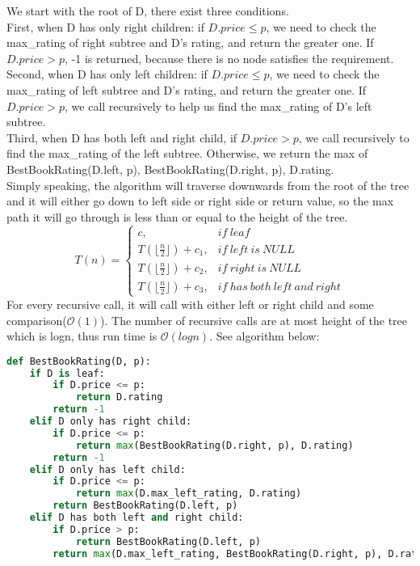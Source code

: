 \documentclass[10pt]{article}
\begin{document}
\begin{enumerate}
We start with the root of D, there exist three conditions.\\
First, when D has only right children: if $D.price \leq p$, we need to check the max\_rating of right subtree and D's rating, and return the greater one. If $D.price > p$, -1 is returned, because there is no node satisfies the requirement.\\Second, when D has only left children: if $D.price \leq p$, we need to check the max\_rating of left subtree and D's rating, and return the greater one. If $D.price > p$, we call recursively to help us find the max\_rating of D's left subtree.\\Third, when D has both left and right child, if $D.price > p$, we call recursively to find the max\_rating of the left subtree. Otherwise, we return the max of BestBookRating(D.left, p), BestBookRating(D.right, p), D.rating.\\
Simply speaking, the algorithm will traverse downwards from the root of the tree and it will either go down to left side or right side or return value, so the max path it will go through is less than or equal to the height of the tree.\\
\begin{equation*}
  T(n)=\begin{cases}
    c, &if\ leaf\\
    T( \lfloor\frac{n}{2}\rfloor) + c_1, &if\ left\ is\ NULL\\
    T(\lfloor\frac{n}{2}\rfloor) + c_2, &if\ right\ is\ NULL\\
    T(\lfloor\frac{n}{2}\rfloor) + c_3, &if\ has\ both\ left\ and\ right
  \end{cases}
\end{equation*}
For every recursive call, it will call with either left or right child and some comparison($\mathcal{O}(1)$). The number of recursive calls are at most height of the tree which is logn, thus run time is $\mathcal{O}(logn)$. See algorithm below:
\begin{lstlisting}[language=Python]
def BestBookRating(D, p):
	if D is leaf:
		if D.price <= p:
			return D.rating
		return -1
	elif D only has right child:
		if D.price <= p:
			return max(BestBookRating(D.right, p), D.rating)
		return -1
	elif D only has left child:
		if D.price <= p:
			return max(D.max_left_rating, D.rating)
		return BestBookRating(D.left, p)
	elif D has both left and right child:
		if D.price > p:
			return BestBookRating(D.left, p)
		return max(D.max_left_rating, BestBookRating(D.right, p), D.rating)
\end{lstlisting}

\end{enumerate}
\end{document}

